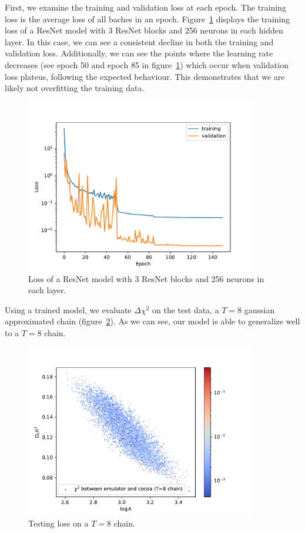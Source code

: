 First, we examine the training and validation loss at each epoch. The training loss is the average loss of all baches in an epoch. Figure~\ref{fig:train_loss_resnet} displays the training loss of a ResNet model with 3 ResNet blocks and 256 neurons in each hidden layer. In this case, we can see a consistent decline in both the training and validation loss. Additionally, we can see the points where the learning rate decreases (see epoch 50 and epoch 85 in figure~\ref{fig:train_loss_resnet}) which occur when validation loss plateus, following the expected behaviour. This demonstrates that we are likely not overfitting the training data.
\begin{figure}[tb]
	\centering
	\includegraphics[width=0.9\textwidth]{plots/losses_resnet_3_256.pdf}
	\caption{Loss of a ResNet model with 3 ResNet blocks and 256 neurons in each layer.}
	\label{fig:train_loss_resnet}
\end{figure}
Using a trained model, we evaluate $\Delta\chi^2$ on the test data, a $T=8$ gaussian approximated chain (figure~\ref{fig:testing_loss}). As we can see, our model is able to generalize well to a $T=8$ chain. 
\begin{figure}[tb]
	\centering
	\includegraphics[width=0.9\textwidth]{plots/cosmic_shear_resnet_nlayer_3_intdim_256.pdf}
	\caption{Testing loss on a $T=8$ chain.}
	\label{fig:testing_loss}
\end{figure}

